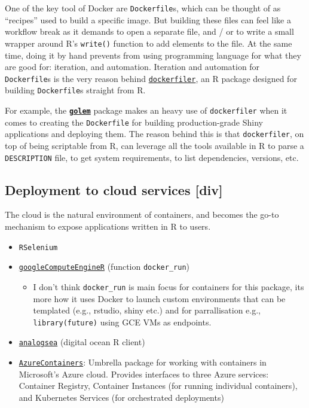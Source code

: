 One of the key tool of Docker are \texttt{Dockerfile}s, which can be
thought of as ``recipes'' used to build a specific image. But building
these files can feel like a workflow break as it demands to open a
separate file, and / or to write a small wrapper around R's
\texttt{write()} function to add elements to the file. At the same time,
doing it by hand prevents from using programming language for what they
are good for: iteration, and automation. Iteration and automation for
\texttt{Dockerfile}s is the very reason behind
\href{https://github.com/ColinFay/dockerfiler}{\texttt{dockerfiler}}, an
R package designed for building \texttt{Dockerfile}s straight from R.

For example, the
\textbf{\href{https://github.com/ThinkR-open/golem}{\texttt{golem}}}
package makes an heavy use of \texttt{dockerfiler} when it comes to
creating the \texttt{Dockerfile} for building production-grade Shiny
applications and deploying them. The reason behind this is that
\texttt{dockerfiler}, on top of being scriptable from R, can leverage
all the tools available in R to parse a \texttt{DESCRIPTION} file, to
get system requirements, to list dependencies, versions, etc.

\hypertarget{deployment-to-cloud-services-div}{%
\subsection{Deployment to cloud services
{[}div{]}}\label{deployment-to-cloud-services-div}}

The cloud is the natural environment of containers, and becomes the
go-to mechanism to expose applications written in R to users.

\begin{itemize}
\tightlist
\item
  \texttt{RSelenium}
\item
  \href{https://cloudyr.github.io/googleComputeEngineR/}{\texttt{googleComputeEngineR}}
  (function \texttt{docker\_run})

  \begin{itemize}
  \tightlist
  \item
    I don't think \texttt{docker\_run} is main focus for containers for
    this package, its more how it uses Docker to launch custom
    environments that can be templated (e.g., rstudio, shiny etc.) and
    for parrallisation e.g., \texttt{library(future)} using GCE VMs as
    endpoints. \citep{MarkEdmondson1234}
  \end{itemize}
\item
  \href{https://github.com/sckott/analogsea}{\texttt{analogsea}}
  (digital ocean R client)
\item
  \href{https://cran.r-project.org/package=AzureContainers}{\texttt{AzureContainers}}:
  Umbrella package for working with containers in Microsoft's Azure
  cloud. Provides interfaces to three Azure services: Container
  Registry, Container Instances (for running individual containers), and
  Kubernetes Services (for orchestrated deployments)
\end{itemize}

